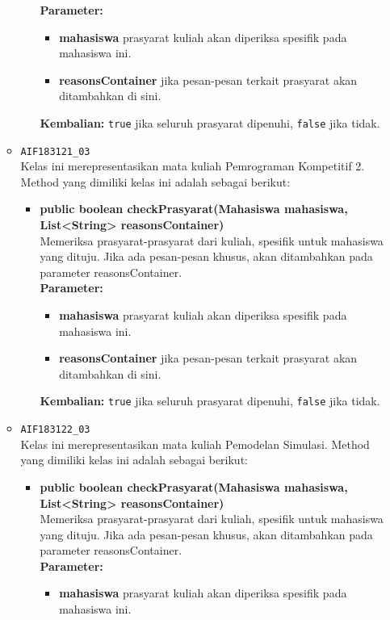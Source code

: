 \begin{enumerate}
\begin{itemize}
\begin{itemize}
			\textbf{Parameter:}
			\begin{itemize}
				\item \textbf{mahasiswa} prasyarat kuliah akan diperiksa spesifik pada mahasiswa ini.
				\item \textbf{reasonsContainer} jika pesan-pesan terkait prasyarat akan ditambahkan di sini.
			\end{itemize}
			\textbf{Kembalian:} \texttt{true} jika seluruh prasyarat dipenuhi, \texttt{false} jika tidak.
		\end{itemize}
		\item \texttt{AIF183121\_03} \\
		Kelas ini merepresentasikan mata kuliah Pemrograman Kompetitif 2. Method yang dimiliki kelas ini adalah sebagai berikut: 
		\begin{itemize}
			\item \textbf{public boolean checkPrasyarat(Mahasiswa mahasiswa, List<String> reasonsContainer)}\\
			Memeriksa prasyarat-prasyarat dari kuliah, spesifik untuk mahasiswa yang dituju. Jika ada pesan-pesan khusus, akan ditambahkan pada parameter reasonsContainer.\\
			\textbf{Parameter:}
			\begin{itemize}
				\item \textbf{mahasiswa} prasyarat kuliah akan diperiksa spesifik pada mahasiswa ini.
				\item \textbf{reasonsContainer} jika pesan-pesan terkait prasyarat akan ditambahkan di sini.
			\end{itemize}
			\textbf{Kembalian:} \texttt{true} jika seluruh prasyarat dipenuhi, \texttt{false} jika tidak.
		\end{itemize}
		\item \texttt{AIF183122\_03} \\
		Kelas ini merepresentasikan mata kuliah Pemodelan Simulasi. Method yang dimiliki kelas ini adalah sebagai berikut: 
		\begin{itemize}
			\item \textbf{public boolean checkPrasyarat(Mahasiswa mahasiswa, List<String> reasonsContainer)}\\
			Memeriksa prasyarat-prasyarat dari kuliah, spesifik untuk mahasiswa yang dituju. Jika ada pesan-pesan khusus, akan ditambahkan pada parameter reasonsContainer.\\
			\textbf{Parameter:}
			\begin{itemize}
				\item \textbf{mahasiswa} prasyarat kuliah akan diperiksa spesifik pada mahasiswa ini.

\end{itemize}
\end{itemize}
\end{itemize}
\end{enumerate}
